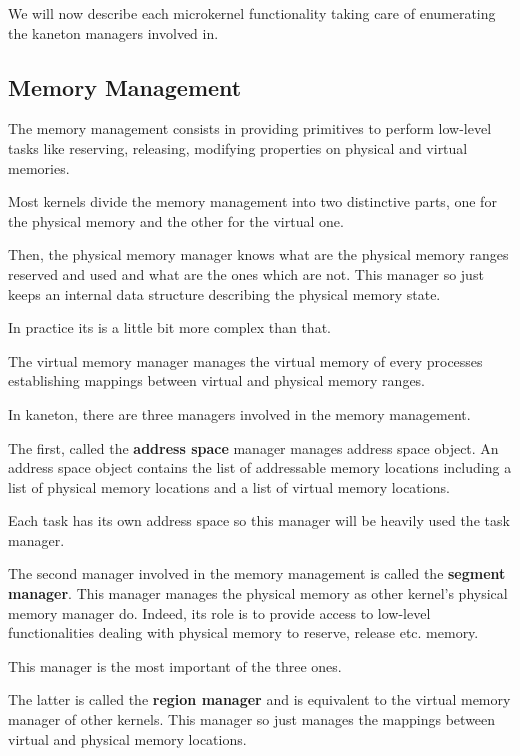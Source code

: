We will now describe each microkernel functionality taking care of
enumerating the kaneton managers involved in.

%
%

\subsection{Memory Management}

The memory management consists in providing primitives to perform
low-level tasks like reserving, releasing, modifying properties on
physical and virtual memories.

Most kernels divide the memory management into two distinctive
parts, one for the physical memory and the other for the virtual one.

Then, the physical memory manager knows what are the physical memory
ranges reserved and used and what are the ones which are not. This
manager so just keeps an internal data structure describing the
physical memory state.

In practice its is a little bit more complex than that.

The virtual memory manager manages the virtual memory of every
processes establishing mappings between virtual and physical memory
ranges.

In kaneton, there are three managers involved in the memory management.

The first, called the \textbf{address space} manager manages address
space object. An address space object contains the list of addressable
memory locations including a list of physical memory locations and
a list of virtual memory locations.

Each task has its own address space so this manager will be heavily
used the task manager.

The second manager involved in the memory management is called the
\textbf{segment manager}. This manager manages the physical memory
as other kernel's physical memory manager do. Indeed, its role
is to provide access to low-level functionalities dealing with
physical memory to reserve, release etc. memory.

This manager is the most important of the three ones.

The latter is called the \textbf{region manager} and is equivalent
to the virtual memory manager of other kernels. This manager so just
manages the mappings between virtual and physical memory locations.

%
%

